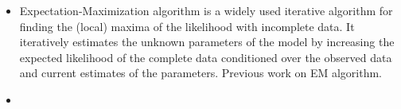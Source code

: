 \documentclass[]{report}
\theoremstyle{definition}
\begin{document}
	
\thispagestyle{empty}

\begin{itemize}
    \item Expectation-Maximization algorithm is a widely used iterative algorithm for finding the (local) maxima of the likelihood with incomplete data. It iteratively estimates the unknown parameters of the model by increasing the expected likelihood of the complete data conditioned over the observed data and current estimates of the parameters. Previous work on EM algorithm\cite{houdouin2023regularizedemalgorithm}.
    \item 
\end{itemize}

    
\end{document}
